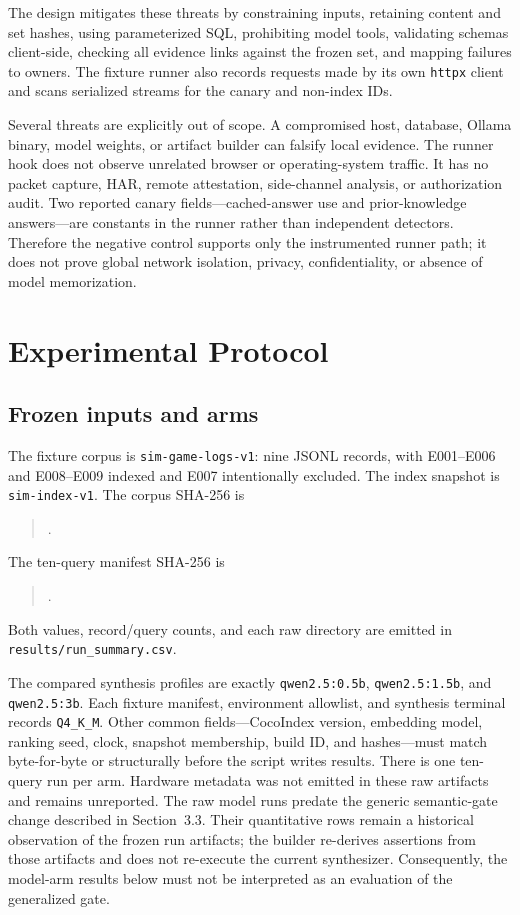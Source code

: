 \documentclass[10pt,twocolumn]{article}
\newcommand{\code}[1]{\texttt{#1}}
\DeclareRobustCommand{\rawpath}[1]{\nolinkurl{#1}}
\begin{document}
The design mitigates these threats by constraining inputs, retaining content and set hashes, using parameterized SQL, prohibiting model tools, validating schemas client-side, checking all evidence links against the frozen set, and mapping failures to owners.  The fixture runner also records requests made by its own \code{httpx} client and scans serialized streams for the canary and non-index IDs.

Several threats are explicitly out of scope.  A compromised host, database, Ollama binary, model weights, or artifact builder can falsify local evidence.  The runner hook does not observe unrelated browser or operating-system traffic.  It has no packet capture, HAR, remote attestation, side-channel analysis, or authorization audit.  Two reported canary fields---cached-answer use and prior-knowledge answers---are constants in the runner rather than independent detectors.  Therefore the negative control supports only the instrumented runner path; it does not prove global network isolation, privacy, confidentiality, or absence of model memorization.

\section{Experimental Protocol}
\subsection{Frozen inputs and arms}
The fixture corpus is \code{sim-game-logs-v1}: nine JSONL records, with E001--E006 and E008--E009 indexed and E007 intentionally excluded.  The index snapshot is \code{sim-index-v1}.  The corpus SHA-256 is
\begin{quote}\tiny\ttfamily
{}.
\end{quote}
The ten-query manifest SHA-256 is
\begin{quote}\tiny\ttfamily
{}.
\end{quote}
Both values, record/query counts, and each raw directory are emitted in \rawpath{results/run_summary.csv}.

The compared synthesis profiles are exactly \code{qwen2.5:0.5b}, \code{qwen2.5:1.5b}, and \code{qwen2.5:3b}.  Each fixture manifest, environment allowlist, and synthesis terminal records \code{Q4\_K\_M}.  Other common fields---CocoIndex version, embedding model, ranking seed, clock, snapshot membership, build ID, and hashes---must match byte-for-byte or structurally before the script writes results.  There is one ten-query run per arm.  Hardware metadata was not emitted in these raw artifacts and remains unreported.
The raw model runs predate the generic semantic-gate change described in Section~3.3.  Their quantitative rows remain a historical observation of the frozen run artifacts; the builder re-derives assertions from those artifacts and does not re-execute the current synthesizer.  Consequently, the model-arm results below must not be interpreted as an evaluation of the generalized gate.
\end{document}
